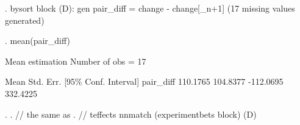 . bysort block (D): gen pair_diff = change - change[_n+1]
(17 missing values generated)

. mean(pair_diff)

Mean estimation                   Number of obs   =         17

             {\VBAR}       Mean   Std. Err.     [95\% Conf. Interval]
   pair_diff {\VBAR}   110.1765   104.8377     -112.0695    332.4225

. 
. // the same as
. // teffects nnmatch (experimentbets block) (D)
